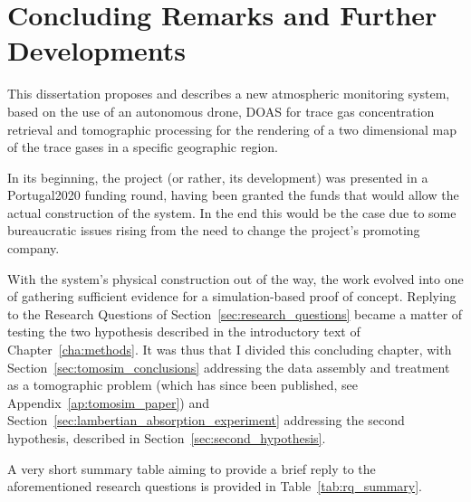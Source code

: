 \chapter{Concluding Remarks and Further Developments}
\label{cha:conclusions}

This dissertation proposes and describes a new atmospheric monitoring
system, based on the use of an autonomous drone, \gls{DOAS} for trace
gas concentration retrieval and tomographic processing for the rendering
of a two dimensional map of the trace gases in a specific geographic
region.

In its beginning,  the project (or rather, its development) was
presented in a Portugal2020 funding round, having been granted the funds
that would allow the actual construction of the system. In the end this
would be the case due to some bureaucratic issues rising from the need
to change the project's promoting company.

With the system's physical construction out of the way, the work evolved
into one of gathering sufficient evidence for a simulation-based proof
of concept. Replying to the Research Questions of
Section~\ref{sec:research_questions} became a matter of testing the two
hypothesis described in the introductory text of
Chapter~\ref{cha:methods}. It was thus that I divided this concluding
chapter, with Section~\ref{sec:tomosim_conclusions} addressing the data
assembly and treatment as a tomographic problem (which has since been
published, see Appendix~\ref{ap:tomosim_paper}) and
Section~\ref{sec:lambertian_absorption_experiment} addressing the second
hypothesis, described in Section~\ref{sec:second_hypothesis}. 

A very short summary table aiming to provide a brief reply to the
aforementioned research questions is provided in
Table~\ref{tab:rq_summary}.

